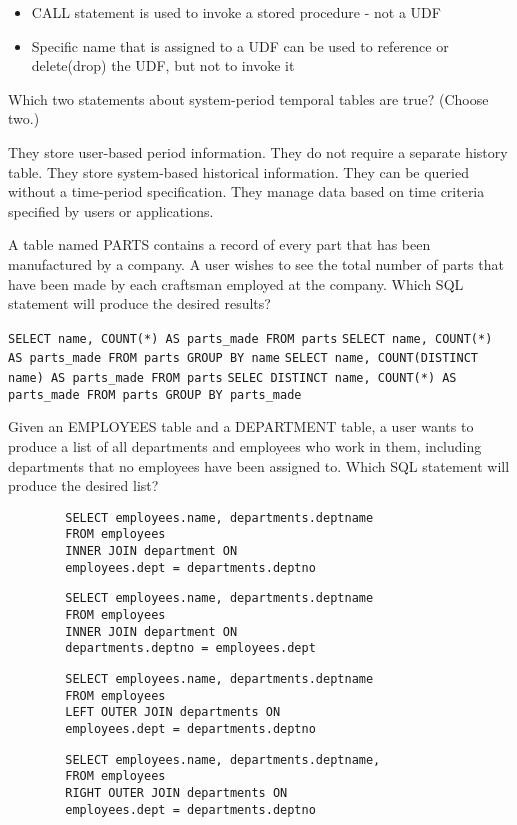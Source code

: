 \documentclass[answers, 11pt]{exam}
\begin{document}
\begin{questions}
\begin{solution}
\begin{itemize}
\item CALL statement is used to invoke a stored procedure - not a UDF
\item Specific name that is assigned to a UDF can be used to reference or delete(drop) the UDF, but
not to invoke it
\end{itemize}
\end{solution}

\question[1]
Which two statements about system-period temporal tables are true? (Choose two.)
\begin{choices}
\choice They store user-based period information.
\choice They do not require a separate history table.
\CorrectChoice They store system-based historical information.
\CorrectChoice They can be queried without a time-period specification.
\choice They manage data based on time criteria specified by users or applications.
\end{choices} 

\question[1]
A table named PARTS contains a record of every part that has been manufactured by a company. A user
wishes to see the total number of parts that have been made by each craftsman employed at the company.
Which SQL statement will produce the desired results?
\begin{choices}
\choice \texttt{SELECT name, COUNT(*) AS parts\_made FROM parts}
\CorrectChoice \texttt{SELECT name, COUNT(*) AS parts\_made FROM parts GROUP BY name}
\choice \texttt{SELECT name, COUNT(DISTINCT name) AS parts\_made FROM parts}
\choice \texttt{SELEC DISTINCT name, COUNT(*) AS parts\_made FROM parts GROUP BY parts\_made}
\end{choices}

\newpage
\question[1]
Given an EMPLOYEES table and a DEPARTMENT table, a user wants to produce a list of all departments and
employees who work in them, including departments that no employees have been assigned to. Which SQL
statement will produce the desired list?
\begin{choices}
\choice \begin{verbatim}
		SELECT employees.name, departments.deptname
		FROM employees
		INNER JOIN department ON
		employees.dept = departments.deptno
		\end{verbatim} 
\choice	\begin{verbatim}
		SELECT employees.name, departments.deptname
		FROM employees
		INNER JOIN department ON
		departments.deptno = employees.dept
		\end{verbatim}
\choice \begin{verbatim}
		SELECT employees.name, departments.deptname
		FROM employees
		LEFT OUTER JOIN departments ON
		employees.dept = departments.deptno
		\end{verbatim}
\CorrectChoice \begin{verbatim}
		SELECT employees.name, departments.deptname,
		FROM employees
		RIGHT OUTER JOIN departments ON
		employees.dept = departments.deptno
		\end{verbatim}
\end{choices}


\end{questions}
\end{document}

